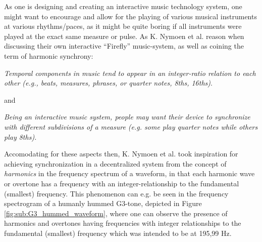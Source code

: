 As one is designing and creating an interactive music technology system, one might want to encourage and allow for the playing of various musical instruments at various rhythms/paces, as it might be quite boring if all instruments were played at the exact same measure or pulse. As K. Nymoen et al. \cite{nymoen_synch} reason when discussing their own interactive ``Firefly'' music-system, as well as coining the term of harmonic synchrony: \nl

\textit{Temporal components in music tend to appear in an integer-ratio relation to each other (e.g., beats, measures, phrases, or quarter notes, 8ths, 16ths)}. \nl

and \nl

\textit{Being an interactive music system, people may want their device to synchronize with different subdivisions of a measure (e.g. some play quarter notes while others play 8ths).} \nl

Accomodating for these aspects then, K. Nymoen et al. took inspiration for achieving synchronization in a decentralized system from the concept of \textit{harmonics} in the frequency spectrum of a waveform, in that each harmonic wave or overtone has a frequency with an integer-relationship to the fundamental (smallest) frequency. This phenomenon can e.g. be seen in the frequency spectrogram of a humanly hummed G3-tone, depicted in Figure \ref{fig:sub:G3_hummed_waveform}, where one can observe the presence of harmonics and overtones having frequencies with integer relationships to the fundamental (smallest) frequency which was intended to be at 195,99 Hz.

